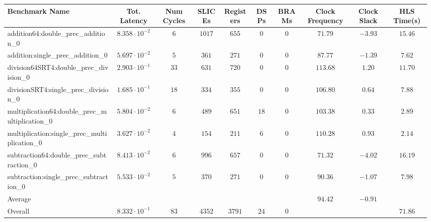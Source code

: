 \begin{tabular}{|l|c|c|c|c|c|c|c|c|c|}
\hline
Benchmark Name                                   & Tot. Latency            & Num Cycles & SLICEs   & Registers & DSPs   & BRAMs & Clock Frequency & Clock Slack & HLS Time(s) \\
\hline
addition64:double\_prec\_addition\_0             & $ 8.358 \cdot 10^{-2} $ & $ 6      $ & $ 1017 $ & $ 655   $ & $ 0  $ & $ 0 $ & $ 71.79       $ & $ -3.93   $ & $ 15.46   $ \\
addition:single\_prec\_addition\_0               & $ 5.697 \cdot 10^{-2} $ & $ 5      $ & $ 361  $ & $ 271   $ & $ 0  $ & $ 0 $ & $ 87.77       $ & $ -1.39   $ & $ 7.62    $ \\
division64SRT4:double\_prec\_division\_0         & $ 2.903 \cdot 10^{-1} $ & $ 33     $ & $ 631  $ & $ 720   $ & $ 0  $ & $ 0 $ & $ 113.68      $ & $ 1.20    $ & $ 11.70   $ \\
divisionSRT4:single\_prec\_division\_0           & $ 1.685 \cdot 10^{-1} $ & $ 18     $ & $ 334  $ & $ 355   $ & $ 0  $ & $ 0 $ & $ 106.80      $ & $ 0.64    $ & $ 7.88    $ \\
multiplication64:double\_prec\_multiplication\_0 & $ 5.804 \cdot 10^{-2} $ & $ 6      $ & $ 489  $ & $ 651   $ & $ 18 $ & $ 0 $ & $ 103.38      $ & $ 0.33    $ & $ 2.89    $ \\
multiplication:single\_prec\_multiplication\_0   & $ 3.627 \cdot 10^{-2} $ & $ 4      $ & $ 154  $ & $ 211   $ & $ 6  $ & $ 0 $ & $ 110.28      $ & $ 0.93    $ & $ 2.14    $ \\
subtraction64:double\_prec\_subtraction\_0       & $ 8.413 \cdot 10^{-2} $ & $ 6      $ & $ 996  $ & $ 657   $ & $ 0  $ & $ 0 $ & $ 71.32       $ & $ -4.02   $ & $ 16.19   $ \\
subtraction:single\_prec\_subtraction\_0         & $ 5.533 \cdot 10^{-2} $ & $ 5      $ & $ 370  $ & $ 271   $ & $ 0  $ & $ 0 $ & $ 90.36       $ & $ -1.07   $ & $ 7.98    $ \\
\hline
Average                                          & $                     $ & $        $ & $      $ & $       $ & $    $ & $   $ & $ 94.42       $ & $ -0.91   $ & $         $ \\
\hline
Overall                                          & $ 8.332 \cdot 10^{-1} $ & $ 83     $ & $ 4352 $ & $ 3791  $ & $ 24 $ & $ 0 $ & $             $ & $         $ & $ 71.86   $ \\
\hline
\end{tabular}
